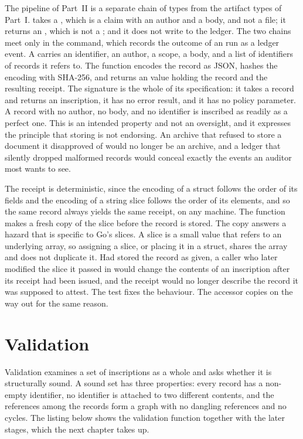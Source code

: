 The pipeline of Part~II is a separate chain of types from the artifact types of Part~I.  takes a , which is a claim with an author and a body, and not a file; it returns an , which is not a ; and it does not write to the ledger. The two chains meet only in the command, which records the outcome of an  run as a ledger event. A  carries an identifier, an author, a scope, a body, and a list of identifiers of records it refers to. The function  encodes the record as JSON, hashes the encoding with SHA-256, and returns an  value holding the record and the resulting receipt. The signature is the whole of its specification: it takes a record and returns an inscription, it has no error result, and it has no policy parameter. A record with no author, no body, and no identifier is inscribed as readily as a perfect one. This is an intended property and not an oversight, and it expresses the principle that storing is not endorsing. An archive that refused to store a document it disapproved of would no longer be an archive, and a ledger that silently dropped malformed records would conceal exactly the events an auditor most wants to see.

The receipt is deterministic, since the encoding of a struct follows the order of its fields and the encoding of a string slice follows the order of its elements, and so the same record always yields the same receipt, on any machine. The function  makes a fresh copy of the  slice before the record is stored. The copy answers a hazard that is specific to Go's slices. A slice is a small value that refers to an underlying array, so assigning a slice, or placing it in a struct, shares the array and does not duplicate it. Had  stored the record as given, a caller who later modified the slice it passed in would change the contents of an inscription after its receipt had been issued, and the receipt would no longer describe the record it was supposed to attest. The test  fixes the behaviour. The accessor  copies on the way out for the same reason.

\section{Validation}

Validation examines a set of inscriptions as a whole and asks whether it is structurally sound. A sound set has three properties: every record has a non-empty identifier, no identifier is attached to two different contents, and the references among the records form a graph with no dangling references and no cycles. The listing below shows the validation function together with the later stages, which the next chapter takes up.

